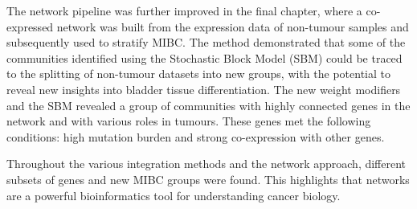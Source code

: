 %
The network pipeline was further improved in the final chapter, where a co-expressed network was built from the expression data of non-tumour samples and subsequently used to stratify MIBC. The method demonstrated that some of the communities identified using the Stochastic Block Model (SBM) could be traced to the splitting of non-tumour datasets into new groups, with the potential to reveal new insights into bladder tissue differentiation. The new weight modifiers and the SBM revealed a group of communities with highly connected genes in the network and with various roles in tumours. These genes met the following conditions: high mutation burden and strong co-expression with other genes.




Throughout the various integration methods and the network approach, different subsets of genes and new MIBC groups were found. This highlights that networks are a powerful bioinformatics tool for understanding cancer biology.

\newpage
